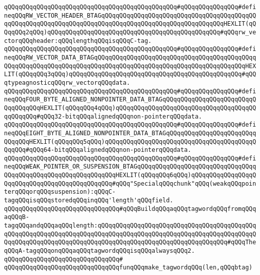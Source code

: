 \verb|qQQqqQQqqQQqqQQqqQQqqQQqqQQqqQQqqQQqqQQqqQQqqQQq#qQQqqQQqqQQqqQQq#defineqQQqRW_VECTOR_HEADER_BTAGqQQqqQQqqQQqqQQqqQQqqQQqqQQqqQQqqQQqqQQqqQQqqQQqqQQqqQQqqQQqqQQqqQQqqQQqqQQqqQQqqQQqqQQqqQQqqQQqqQQqqQQqHEXLIT(qQQqqQQq2qQQq)qQQqqQQqqQQqqQQqqQQqqQQqqQQqqQQqqQQqqQQqqQQqqQQq#qQQqrw_vectorqQQqheader:qQQqlengthqQQqisqQQqC-tag.|\newline
\verb|qQQqqQQqqQQqqQQqqQQqqQQqqQQqqQQqqQQqqQQqqQQqqQQq#qQQqqQQqqQQqqQQq#defineqQQqRW_VECTOR_DATA_BTAGqQQqqQQqqQQqqQQqqQQqqQQqqQQqqQQqqQQqqQQqqQQqqQQqqQQqqQQqqQQqqQQqqQQqqQQqqQQqqQQqqQQqqQQqqQQqqQQqqQQqqQQqqQQqqQQqHEXLIT(qQQqqQQq3qQQq)qQQqqQQqqQQqqQQqqQQqqQQqqQQqqQQqqQQqqQQqqQQqqQQq#qQQqtypeagnosticqQQqrw_vectorqQQqdata.|\newline
\verb|qQQqqQQqqQQqqQQqqQQqqQQqqQQqqQQqqQQqqQQqqQQqqQQq#qQQqqQQqqQQqqQQq#defineqQQqFOUR_BYTE_ALIGNED_NONPOINTER_DATA_BTAGqQQqqQQqqQQqqQQqqQQqqQQqqQQqqQQqqQQqHEXLIT(qQQqqQQq4qQQq)qQQqqQQqqQQqqQQqqQQqqQQqqQQqqQQqqQQqqQQqqQQqqQQq#qQQq32-bitqQQqalignedqQQqnon-pointerqQQqdata.|\newline
\verb|qQQqqQQqqQQqqQQqqQQqqQQqqQQqqQQqqQQqqQQqqQQqqQQq#qQQqqQQqqQQqqQQq#defineqQQqEIGHT_BYTE_ALIGNED_NONPOINTER_DATA_BTAGqQQqqQQqqQQqqQQqqQQqqQQqqQQqqQQqHEXLIT(qQQqqQQq5qQQq)qQQqqQQqqQQqqQQqqQQqqQQqqQQqqQQqqQQqqQQqqQQqqQQq#qQQq64-bitqQQqalignedqQQqnon-pointerqQQqdata.|\newline
\verb|qQQqqQQqqQQqqQQqqQQqqQQqqQQqqQQqqQQqqQQqqQQqqQQq#qQQqqQQqqQQqqQQq#defineqQQqWEAK_POINTER_OR_SUSPENSION_BTAGqQQqqQQqqQQqqQQqqQQqqQQqqQQqqQQqqQQqqQQqqQQqqQQqqQQqqQQqqQQqqQQqHEXLIT(qQQqqQQq6qQQq)qQQqqQQqqQQqqQQqqQQqqQQqqQQqqQQqqQQqqQQqqQQqqQQq#qQQq"SpecialqQQqchunk"qQQq(weakqQQqpointerqQQqorqQQqsuspension):qQQqC-tagqQQqisqQQqstoredqQQqinqQQq'length'qQQqfield.|\newline
\newline
\newline
\newline
\newline
\verb|qQQqqQQqqQQqqQQqqQQqqQQqqQQqqQQq#qQQqBuildqQQqaqQQqtagwordqQQqfromqQQqaqQQqB-tagqQQqandqQQqaqQQqlength:qQQqqQQqqQQqqQQqqQQqqQQqqQQqqQQqqQQqqQQqqQQqqQQqqQQqqQQqqQQqqQQqqQQqqQQqqQQqqQQqqQQqqQQqqQQqqQQqqQQqqQQqqQQqqQQqqQQqqQQqqQQqqQQqqQQqqQQqqQQqqQQqqQQqqQQqqQQqqQQqqQQqqQQqqQQqqQQq#qQQqTheqQQqA-tagqQQqonqQQqaqQQqtagwordqQQqisqQQqalwaysqQQq2.|\newline
\verb|qQQqqQQqqQQqqQQqqQQqqQQqqQQqqQQq#|\newline
\verb|qQQqqQQqqQQqqQQqqQQqqQQqqQQqqQQqfunqQQqmake_tagwordqQQq(len,qQQqbtag)|\newline
